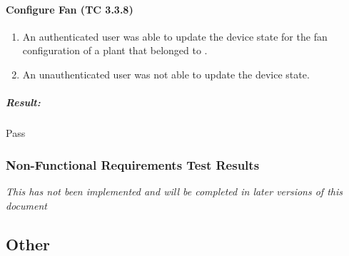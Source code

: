 \documentclass{article}
\begin{document}
			\paragraph{Configure Fan (TC 3.3.8)}
				\begin{enumerate}
					\item An authenticated user was able to update the device state for the fan configuration of a plant that belonged to .
					\item An unauthenticated user was not able to update the device state.
				\end{enumerate}
				\subparagraph{Result: } Pass
			
		\subsubsection{Non-Functional Requirements Test Results}
			\textit{This has not been implemented and will be completed in later versions of this document}
	\subsection{Other}
\end{document}
